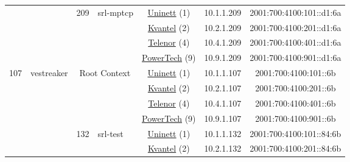 \begin{small}
\begin{center}
\begin{longtable}{|c|c|c|c|c|c|c|c|}
  &  & \multirow{4}{*}{\tiny{209}} & \multicolumn{1}{|l|}{\multirow{4}{*}{\tiny{srl-mptcp}}} & \multicolumn{2}{|c|}{\tiny{\href{https://www.uninett.no}{Uninett} (1)}} & \tiny{10.1.1.209} & \tiny{2001:700:4100:101::d1:6a} \\* \cline{5-5}\cline{6-6}\cline{7-7}\cline{8-8}
  &  &  &  & \multicolumn{2}{|c|}{\tiny{\href{http://kvantel.no}{Kvantel} (2)}} & \tiny{10.2.1.209} & \tiny{2001:700:4100:201::d1:6a} \\* \cline{5-5}\cline{6-6}\cline{7-7}\cline{8-8}
  &  &  &  & \multicolumn{2}{|c|}{\tiny{\href{https://www.telenor.no}{Telenor} (4)}} & \tiny{10.4.1.209} & \tiny{2001:700:4100:401::d1:6a} \\* \cline{5-5}\cline{6-6}\cline{7-7}\cline{8-8}
  &  &  &  & \multicolumn{2}{|c|}{\tiny{\href{http://www.powertech.no}{PowerTech} (9)}} & \tiny{10.9.1.209} & \tiny{2001:700:4100:901::d1:6a} \\ \hline
 \multirow{36}{*}{\tiny{107}} & \multicolumn{1}{|l|}{\multirow{36}{*}{\tiny{vestreaker}}} & \multicolumn{2}{|c|}{\multirow{4}{*}{\tiny{Root Context}}} & \multicolumn{2}{|c|}{\tiny{\href{https://www.uninett.no}{Uninett} (1)}} & \tiny{10.1.1.107} & \tiny{2001:700:4100:101::6b} \\* \cline{5-5}\cline{6-6}\cline{7-7}\cline{8-8}
  &  & \multicolumn{2}{|c|}{} & \multicolumn{2}{|c|}{\tiny{\href{http://kvantel.no}{Kvantel} (2)}} & \tiny{10.2.1.107} & \tiny{2001:700:4100:201::6b} \\* \cline{5-5}\cline{6-6}\cline{7-7}\cline{8-8}
  &  & \multicolumn{2}{|c|}{} & \multicolumn{2}{|c|}{\tiny{\href{https://www.telenor.no}{Telenor} (4)}} & \tiny{10.4.1.107} & \tiny{2001:700:4100:401::6b} \\* \cline{5-5}\cline{6-6}\cline{7-7}\cline{8-8}
  &  & \multicolumn{2}{|c|}{} & \multicolumn{2}{|c|}{\tiny{\href{http://www.powertech.no}{PowerTech} (9)}} & \tiny{10.9.1.107} & \tiny{2001:700:4100:901::6b} \\* \cline{3-3}\cline{4-4}\cline{5-5}\cline{6-6}\cline{7-7}\cline{8-8}
  &  & \multirow{4}{*}{\tiny{132}} & \multicolumn{1}{|l|}{\multirow{4}{*}{\tiny{srl-test}}} & \multicolumn{2}{|c|}{\tiny{\href{https://www.uninett.no}{Uninett} (1)}} & \tiny{10.1.1.132} & \tiny{2001:700:4100:101::84:6b} \\* \cline{5-5}\cline{6-6}\cline{7-7}\cline{8-8}
  &  &  &  & \multicolumn{2}{|c|}{\tiny{\href{http://kvantel.no}{Kvantel} (2)}} & \tiny{10.2.1.132} & \tiny{2001:700:4100:201::84:6b} \\* \cline{5-5}\cline{6-6}\cline{7-7}\cline{8-8}

\end{longtable}
\end{center}
\end{small}
